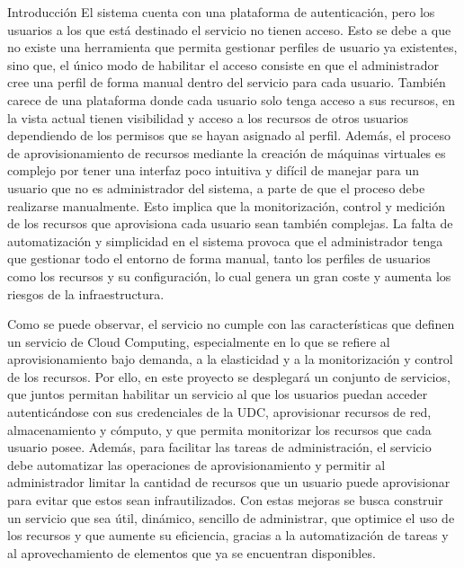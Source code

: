\begin{chapter}{Introducción}
El sistema cuenta con una plataforma de autenticación, pero los usuarios a los que está destinado el servicio no tienen acceso. Esto se debe a que no existe una herramienta que permita gestionar perfiles de usuario ya existentes, sino que, el único modo de habilitar el acceso consiste en que el administrador cree una perfil de forma manual dentro del servicio para cada usuario. También carece de una plataforma donde cada usuario solo tenga acceso a sus recursos, en la vista actual tienen visibilidad y acceso a los recursos de otros usuarios dependiendo de los permisos que se hayan asignado al perfil. Además, el proceso de aprovisionamiento de recursos mediante la creación de máquinas virtuales es complejo por tener una interfaz poco intuitiva y difícil de manejar para un usuario que no es administrador del sistema, a parte de que el proceso debe realizarse manualmente. Esto implica que la monitorización, control y medición de los recursos que aprovisiona cada usuario sean también complejas. La falta de automatización y simplicidad en el sistema provoca que el administrador tenga que gestionar todo el entorno de forma manual, tanto los perfiles de usuarios como los recursos y su configuración, lo cual genera un gran coste y aumenta los riesgos de la infraestructura.

Como se puede observar, el servicio no cumple con las características que definen un servicio de Cloud Computing, especialmente en lo que se refiere al aprovisionamiento bajo demanda, a la elasticidad y a la monitorización y control de los recursos. Por ello, en este proyecto se desplegará un conjunto de servicios, que juntos permitan habilitar un servicio al que los usuarios puedan acceder autenticándose con sus credenciales de la UDC, aprovisionar recursos de red, almacenamiento y cómputo, y que permita monitorizar los recursos que cada usuario posee. Además, para facilitar las tareas de administración, el servicio debe automatizar las operaciones de aprovisionamiento y permitir al administrador limitar la cantidad de recursos que un usuario puede aprovisionar para evitar que estos sean infrautilizados.
Con estas mejoras se busca construir un servicio que sea útil, dinámico, sencillo de administrar, que optimice el uso de los recursos y que aumente su eficiencia, gracias a la automatización de tareas y al aprovechamiento de elementos que ya se encuentran disponibles.


\end{chapter}
